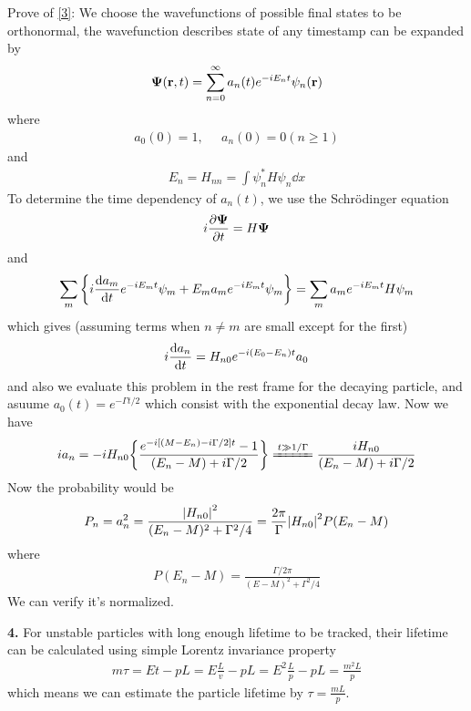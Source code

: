 \documentclass{article}
\begin{document}
Prove\cite{IHP} of \eqref{3}: We choose the wavefunctions of possible final states to be orthonormal, the wavefunction describes state of any timestamp can be expanded by
\begin{align*}
  \boldsymbol{\Psi}(\vb{r},t)=\sum_{n=0}^{\infty}a_n(t)e^{-iE_nt}\psi_n(\vb{r})
\end{align*}
where
\begin{align*}
  a_0(0)=1,\;\;\;\;\;a_n(0)=0(n\geq1)
\end{align*}
and
\begin{align*}
  E_n=H_{nn}=\int\psi^*_nH\psi_n\dd x
\end{align*}
To determine the time dependency of $a_n(t)$, we use the Schr\"odinger equation
\begin{align*}
  i\pdv{\boldsymbol{\Psi}}{t}=H\boldsymbol{\Psi}
\end{align*}
and
\begin{align*}
  \sum_m\Bqty{i\dv{a_m}{t}e^{-iE_mt}\psi_m+E_ma_me^{-iE_mt}\psi_m}=\sum_ma_me^{-iE_mt}H\psi_m
\end{align*}
which gives (assuming terms when $n\neq m$ are small except for the first)
\begin{align*}
  i\dv{a_n}{t}=H_{n0}e^{-i(E_0-E_n)t}a_0
\end{align*}
and also we evaluate this problem in the rest frame for the decaying particle, and asuume $a_0(t)=e^{-\Gamma t/2}$ which consist with the exponential decay law. Now we have
\begin{align*}
  ia_n=-iH_{n0}\Bqty{\frac{e^{-i[(M-E_n)-i\Gamma/2]t}-1}{(E_n-M)+i\Gamma/2}}\xlongequal{t\gg1/\Gamma}\frac{iH_{n0}}{(E_n-M)+i\Gamma/2}
\end{align*}
Now the probability would be
\begin{align*}
  P_n=a_n^2=\frac{\abs{H_{n0}}^2}{(E_n-M)^2+\Gamma^2/4}=\frac{2\pi}{\Gamma}\abs{H_{n0}}^2P(E_n-M)
\end{align*}
where
\begin{align*}
  P(E_n-M)=\frac{\Gamma/2\pi}{(E-M)^2+\Gamma^2/4}
\end{align*}
We can verify it's normalized.

{\bf4.} For unstable particles with long enough lifetime to be tracked, their lifetime can be calculated using simple Lorentz invariance property
\begin{align*}
  m\tau=Et-pL=E\frac{L}{v}-pL=E^2\frac{L}{p}-pL=\frac{m^2L}{p}
\end{align*}
which means we can estimate the particle lifetime by $\tau=\frac{mL}{p}$.
\end{document}

